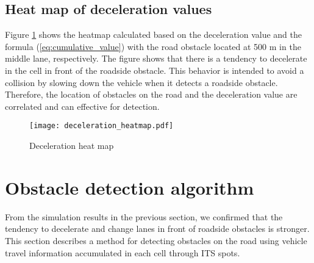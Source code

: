 \documentclass[paper]{ieice}
\begin{document}
\subsection{Heat map of deceleration values}
\label{seq:heat_map_of_deceleration_values}
%
Figure \ref{fig:deceleration_heatmap} shows the heatmap calculated based on the deceleration value and the formula (\ref{eq:cumulative_value}) with the road obstacle located at 500 m in the middle lane, respectively.
%
The figure shows that there is a tendency to decelerate in the cell in front of the roadside obstacle.
%
This behavior is intended to avoid a collision by slowing down the vehicle when it detects a roadside obstacle.
%
Therefore, the location of obstacles on the road and the deceleration value are correlated and can effective for detection.
%
\begin{figure}[tb]
  \centering
  \texttt{[image: deceleration\_heatmap.pdf]}
  \label{fig:deceleration_heatmap}
  \caption{Deceleration heat map}
\end{figure}
%
\section{Obstacle detection algorithm}
\label{sec:obstacle_detection_algorithm}
%
From the simulation results in the previous section, we confirmed that the tendency to decelerate and change lanes in front of roadside obstacles is stronger.
%
This section describes a method for detecting obstacles on the road using vehicle travel information accumulated in each cell through ITS spots.
%
\end{document}
